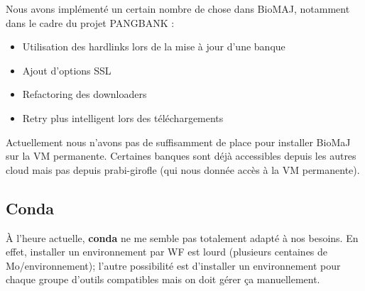 Nous avons implémenté un certain nombre de chose dans BioMAJ, notamment dans le cadre du projet PANGBANK :
\begin{itemize}
    \item Utilisation des hardlinks lors de la mise à jour d'une banque
    \item Ajout d'options SSL
    \item Refactoring des downloaders
    \item Retry plus intelligent lors des téléchargements
\end{itemize}
Actuellement nous n'avons pas de suffisamment de place pour installer BioMaJ sur la VM permanente. Certaines banques sont déjà accessibles depuis les autres cloud mais pas depuis prabi-girofle (qui nous donnée accès à la VM permanente).

\subsection{Conda}
À l'heure actuelle, \textbf{conda} ne me semble pas totalement adapté à nos besoins. En effet, installer un environnement par WF est lourd (plusieurs centaines de Mo/environnement); l'autre possibilité est d'installer un environnement pour chaque groupe d'outils compatibles mais on doit gérer ça manuellement.